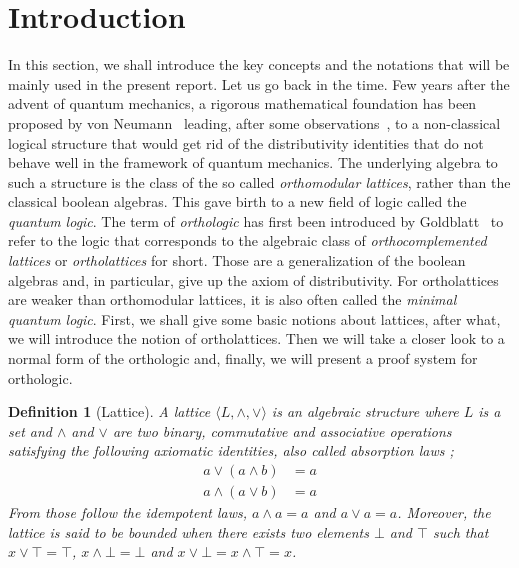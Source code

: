 \documentclass[a4paper, 11pt]{article}
\newtheorem{definition}[theorem]{Definition}
\begin{document}
	\newpage
    \section{Introduction}
    In this section, we shall introduce the key concepts and the notations that will be mainly used in
    the present report. Let us go back in the time. Few years after the advent of quantum mechanics, a 
    rigorous mathematical 
    foundation has been proposed by von Neumann~\cite{30573279-e8ec-3f1e-b0ba-eaf73275f821} leading, 
    after some observations~\cite{2c73be7a-3de4-3824-8e11-49ebe4b183e4}, to a 
    non-classical logical structure that would get rid of the distributivity identities that do not
    behave well in the framework of quantum mechanics. 
    The underlying algebra to such a structure is the class of the so
    called \textit{orthomodular lattices}, rather than the classical boolean algebras. This gave birth 
    to a new
    field of logic called the \textit{quantum logic}. The term of \textit{orthologic} has first been 
    introduced
    by Goldblatt~\cite{865e9aad-6de2-3b16-9861-412a9b18e683} to refer to the logic that corresponds to
    the algebraic class of \textit{orthocomplemented lattices} or \textit{ortholattices} for short.
    Those are a generalization of the boolean algebras and, in particular, give up the axiom of 
    distributivity. For ortholattices are weaker than orthomodular lattices, it is also
    often called the \textit{minimal quantum logic}. 
    First, we shall give some basic notions about lattices, after what, we will introduce the 
    notion of ortholattices. Then we will take a closer look to
    a normal form of the orthologic and, finally, we will present a proof system for orthologic.
    \begin{definition}[Lattice]
	    A lattice $\langle L,\wedge,\vee\rangle$ is an algebraic structure where $L$ is a set and 
	    $\wedge$ and $\vee$ are two binary, commutative and associative operations satisfying the
	    following axiomatic identities, also called \textit{absorption laws} ;
	    \begin{align*}
		    a\vee(a\wedge b)&=a\\
		    a\wedge(a\vee b)&=a
	    \end{align*}
	    From those follow the idempotent laws, $a\wedge a=a$ and $a\vee a=a$. Moreover, the lattice 
	    is said to be bounded when there exists two elements $\bot$ and $\top$
	    such that $x\vee\top=\top$, $x\wedge\bot=\bot$ and $x\vee\bot=x\wedge\top=x$.
    \end{definition}
\end{document}

